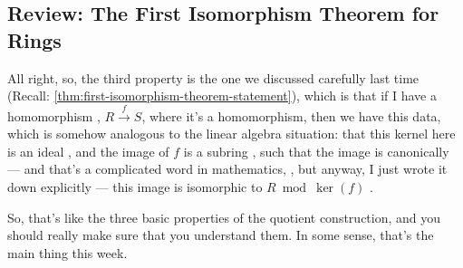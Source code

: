 \begin{hidden}
\end{hidden}

\subsection{Review: The First Isomorphism Theorem for Rings}

\begin{speech}[00:07:05 - 00:08:04]
All right, so, the third property is the one we discussed carefully last time (Recall: \cref{thm:first-isomorphism-theorem-statement}), which is that if I have a homomorphism , $R \xrightarrow{f} S$, where it's a homomorphism, then we have this data, which is somehow analogous to the linear algebra situation: that this kernel here is an ideal , and the image of $f$ is a subring , such that the image is canonically --- and that's a complicated word in mathematics, , but anyway, I just wrote it down explicitly --- this image is isomorphic to $R \bmod \ker(f)$ .

So, that's like the three basic properties of the quotient construction, and you should really make sure that you understand them. In some sense, that's the main thing this week.
\end{speech}

